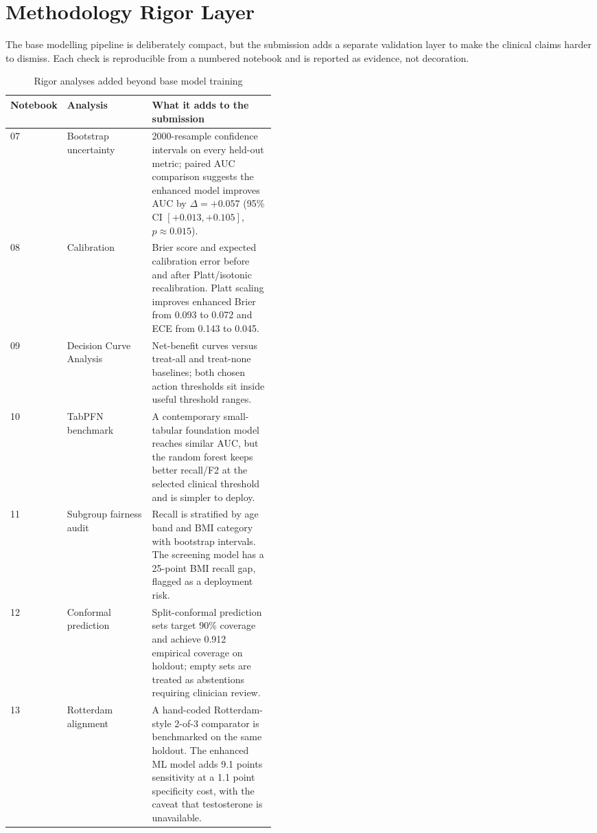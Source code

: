 \documentclass[11pt]{article}
\begin{document}
\section{Methodology Rigor Layer}

The base modelling pipeline is deliberately compact, but the submission adds a separate validation layer to make the clinical claims harder to dismiss. Each check is reproducible from a numbered notebook and is reported as evidence, not decoration.

\begin{table}[H]
\centering
\caption{Rigor analyses added beyond base model training}
\small
\begin{tabularx}{\linewidth}{p{0.13\linewidth}p{0.32\linewidth}X}
\toprule
Notebook & Analysis & What it adds to the submission \\
\midrule
07 & Bootstrap uncertainty & 2000-resample confidence intervals on every held-out metric; paired AUC comparison suggests the enhanced model improves AUC by $\Delta=+0.057$ (95\% CI $[+0.013,+0.105]$, $p\approx0.015$). \\
08 & Calibration & Brier score and expected calibration error before and after Platt/isotonic recalibration. Platt scaling improves enhanced Brier from 0.093 to 0.072 and ECE from 0.143 to 0.045. \\
09 & Decision Curve Analysis & Net-benefit curves versus treat-all and treat-none baselines; both chosen action thresholds sit inside useful threshold ranges. \\
10 & TabPFN benchmark & A contemporary small-tabular foundation model reaches similar AUC, but the random forest keeps better recall/F2 at the selected clinical threshold and is simpler to deploy. \\
11 & Subgroup fairness audit & Recall is stratified by age band and BMI category with bootstrap intervals. The screening model has a 25-point BMI recall gap, flagged as a deployment risk. \\
12 & Conformal prediction & Split-conformal prediction sets target 90\% coverage and achieve 0.912 empirical coverage on holdout; empty sets are treated as abstentions requiring clinician review. \\
13 & Rotterdam alignment & A hand-coded Rotterdam-style 2-of-3 comparator is benchmarked on the same holdout. The enhanced ML model adds 9.1 points sensitivity at a 1.1 point specificity cost, with the caveat that testosterone is unavailable. \\
\bottomrule
\end{tabularx}
\end{table}
\end{document}
